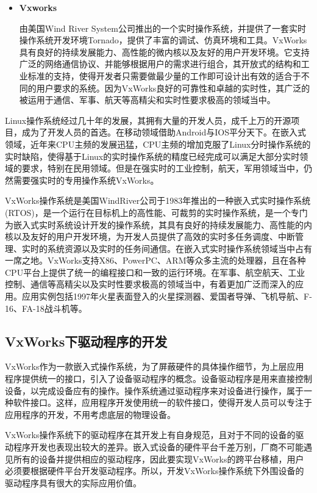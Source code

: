 \begin{itemize}
\item \textbf{Vxworks}

	由美国Wind River System公司推出的一个实时操作系统，并提供了一套实时操作系统开发环境Tornado，提供了丰富的调试、仿真环境和工具。VxWorks具有良好的持续发展能力、高性能的微内核以及友好的用户开发环境。它支持广泛的网络通信协议、并能够根据用户的需求进行组合，其开放式的结构和工业标准的支持，使得开发者只需要做最少量的工作即可设计出有效的适合于不同的用户要求的系统。因为VxWorks良好的可靠性和卓越的实时性，其广泛的被运用于通信、军事、航天等高精尖和实时性要求极高的领域当中。	
	 
\end{itemize}

	Linux操作系统经过几十年的发展，其拥有大量的开发人员，成千上万的开源项目，成为了开发人员的首选。在移动领域借助Android与IOS平分天下。在嵌入式领域，近年来CPU主频的发展迅猛，CPU主频的增加克服了Linux分时操作系统的实时缺陷，使得基于Linux的实时操作系统的精度已经完成可以满足大部分实时领域的要求，特别在民用领域。但是在强实时的工业控制，航天，军用领域当中，仍然需要强实时的专用操作系统VxWorks。 	
	
	VxWorks操作系统是美国WindRiver公司于1983年推出的一种嵌入式实时操作系统(RTOS)，是一个运行在目标机上的高性能、可裁剪的实时操作系统，是一个专门为嵌入式实时系统设计开发的操作系统，其具有良好的持续发展能力、高性能的内核以及友好的用户开发环境，为开发人员提供了高效的实时多任务调度、中断管理、实时的系统资源以及实时的任务间通信。在嵌入式实时操作系统领域当中占有一席之地。VxWorks支持X86、PowerPC、ARM等众多主流的处理器，且在各种CPU平台上提供了统一的编程接口和一致的运行环境。在军事、航空航天、工业控制、通信等高精尖以及实时性要求极高的领域当中，有着更加广泛而深入的应用。应用实例包括1997年火星表面登入的火星探测器、爱国者导弹、飞机导航、F-16、FA-18战斗机等。
	
\subsection{VxWorks下驱动程序的开发}
	
	VxWorks作为一款嵌入式操作系统，为了屏蔽硬件的具体操作细节，为上层应用程序提供统一的接口，引入了设备驱动程序的概念。设备驱动程序是用来直接控制设备，以完成设备应有的操作。操作系统通过驱动程序来对设备进行操作，属于一种软件接口。这样，应用程序开发使用统一的软件接口，使得开发人员可以专注于应用程序的开发，不用考虑底层的物理设备。
	
	VxWorks操作系统下的驱动程序在其开发上有自身规范，且对于不同的设备的驱动程序开发也表现出较大的差异。嵌入式设备的硬件平台千差万别，厂商不可能遇见所有的设备并提供相应的驱动程序，因此要实现VxWorks的跨平台移植，用户必须要根据硬件平台开发驱动程序。所以，开发VxWorks操作系统下外围设备的驱动程序具有很大的实际应用价值。
		
